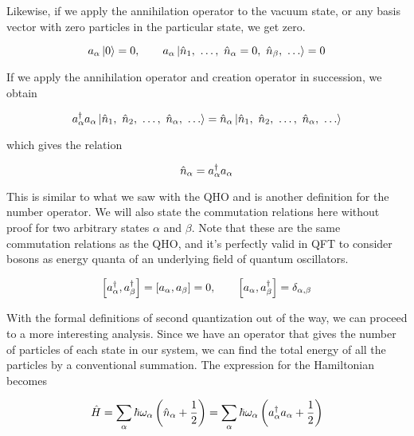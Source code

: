 Likewise, if we apply the annihilation operator to the vacuum state, or any basis vector with zero particles in the particular state, we get zero.

\begin{equation}
	a_{\alpha} \ket{0} = 0, \qquad a_{\alpha} \ket{\hat{n}_1,\ \dots,\ \hat{n}_{\alpha}=0,\ \hat{n}_{\beta},\ \dots} = 0
\end{equation}

If we apply the annihilation operator and creation operator in succession, we obtain

\begin{equation*}
\ad_{\alpha} a_{\alpha} \ket{\hat{n}_1,\ \hat{n}_2,\ \dots,\ \hat{n}_{\alpha},\ \dots} = \hat{n}_{\alpha}\ket{\hat{n}_1,\ \hat{n}_2,\ \dots,\ \hat{n}_{\alpha},\ \dots}
\end{equation*}

\noindent which gives the relation

\begin{equation}
	\hat{n}_{\alpha} = a^{\dagger}_{\alpha}a_{\alpha}
\end{equation}

This is similar to what we saw with the QHO and is another definition for the number operator. 
We will also state the commutation relations here without proof for two arbitrary states $\alpha$ and $\beta$. 
Note that these are the same commutation relations as the QHO, and it's perfectly valid in QFT to consider bosons as energy quanta of an underlying field of quantum oscillators.

\begin{equation}
	\left[a^{\dagger}_{\alpha},a^{\dagger}_{\beta}\right] = \left[a_{\alpha},a_{\beta}\right] = 0, \qquad \left[a_{\alpha}, a^{\dagger}_{\beta}\right] = \delta_{\alpha,\beta}
\end{equation}

With the formal definitions of second quantization out of the way, we can proceed to a more interesting analysis. 
Since we have an operator that gives the number of particles of each state in our system, we can find the total energy of all the particles by a conventional summation. 
The expression for the Hamiltonian becomes

\begin{equation}
	\hat{H} = \sum_{\alpha} \hbar\omega_{\alpha} \left(\hat{n}_{\alpha} + \frac{1}{2} \right) = \sum_{\alpha} \hbar\omega_{\alpha} \left(a^{\dagger}_{\alpha}a_{\alpha} + \frac{1}{2}\right)
\end{equation}


